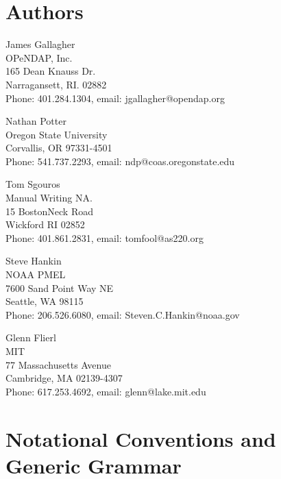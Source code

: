 \documentclass[justify]{nasa-ese}
\begin{document}
\T{}
\T\raggedright


\T{}
\T\raggedright
\section*{Authors}
James Gallagher\\
OPeNDAP, Inc.\\
165 Dean Knauss Dr.\\
Narragansett, RI. 02882\\
Phone: 401.284.1304, email: jgallagher@opendap.org\\
\vspace{1.5em}

Nathan Potter\\
Oregon State University\\
Corvallis, OR 97331-4501\\
Phone: 541.737.2293, email: ndp@coas.oregonstate.edu\\
\vspace{1.5em}

Tom Sgouros\\
Manual Writing NA.\\
15 BostonNeck Road\\
Wickford RI 02852\\
Phone: 401.861.2831, email: tomfool@as220.org\\
\vspace{1.5em}

Steve Hankin\\
NOAA PMEL\\
7600 Sand Point Way NE\\
Seattle, WA 98115\\
Phone: 206.526.6080, email: Steven.C.Hankin@noaa.gov\\
\vspace{1.5em}

Glenn Flierl\\
MIT\\
77 Massachusetts Avenue\\
Cambridge, MA 02139-4307\\
Phone: 617.253.4692, email: glenn@lake.mit.edu\\
\T\appendix

\section{Notational Conventions and Generic Grammar}
\label{app:grammar}

\end{document}

